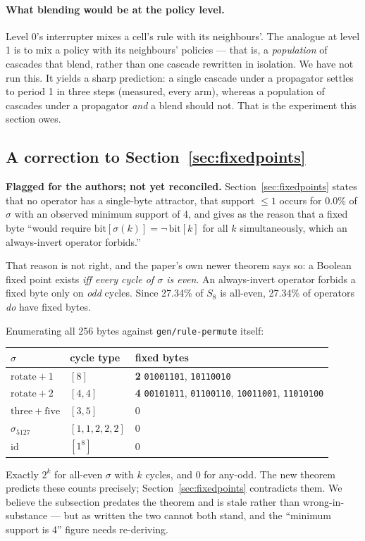 \documentclass[man,12pt,floatsintext]{apa7}
\newcommand{\sig}{\sigma}
\newcommand{\bit}[1]{\mathrm{bit}[#1]}
\begin{document}
\paragraph{What blending would be at the policy level.}
Level 0's interrupter mixes a cell's rule with its neighbours'. The analogue at
level 1 is to mix a policy with its neighbours' policies --- that is, a
\emph{population} of cascades that blend, rather than one cascade rewritten in
isolation. We have not run this. It yields a sharp prediction: a single cascade
under a propagator settles to period 1 in three steps (measured, every arm),
whereas a population of cascades under a propagator \emph{and} a blend should not.
That is the experiment this section owes.

\subsection{A correction to \texorpdfstring{Section~\ref{sec:fixedpoints}}{Exact fixed points}}

\textbf{Flagged for the authors; not yet reconciled.} Section~\ref{sec:fixedpoints}
states that no operator has a single-byte attractor, that support $\le 1$ occurs
for 0.0\% of $\sig$ with an observed minimum support of 4, and gives as the reason
that a fixed byte ``would require $\bit{\sig(k)} = \lnot\,\bit{k}$ for all $k$
simultaneously, which an always-invert operator forbids.''

That reason is not right, and the paper's own newer theorem says so: a Boolean
fixed point exists \emph{iff every cycle of $\sig$ is even}. An always-invert
operator forbids a fixed byte only on \emph{odd} cycles. Since 27.34\% of $S_8$ is
all-even, 27.34\% of operators \emph{do} have fixed bytes.

Enumerating all 256 bytes against \texttt{gen/rule-permute} itself:
\begin{center}
\begin{tabular}{lll}
\toprule
$\sig$ & cycle type & fixed bytes \\
\midrule
$\mathrm{rotate}{+}1$ & $[8]$          & \textbf{2} \quad \texttt{01001101}, \texttt{10110010} \\
$\mathrm{rotate}{+}2$ & $[4,4]$        & \textbf{4} \quad \texttt{00101011}, \texttt{01100110}, \texttt{10011001}, \texttt{11010100} \\
$\mathrm{three{+}five}$ & $[3,5]$      & 0 \\
$\sig_{5127}$ & $[1,1,2,2,2]$          & 0 \\
$\mathrm{id}$ & $[1^8]$                & 0 \\
\bottomrule
\end{tabular}
\end{center}
Exactly $2^{k}$ for all-even $\sig$ with $k$ cycles, and $0$ for any-odd. The new
theorem predicts these counts precisely; Section~\ref{sec:fixedpoints} contradicts
them. We believe the subsection predates the theorem and is stale rather than
wrong-in-substance --- but as written the two cannot both stand, and the
``minimum support is 4'' figure needs re-deriving.
\end{document}
